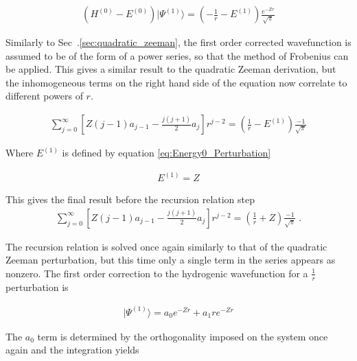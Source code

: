 
            \begin{align}
                \left(H^{(0)} - E^{(0)}\right) \vert \varPsi^{(1)}\rangle = \left( -\frac{1}{r} - E^{(1)} \right) \frac{e^{-Zr}}{\sqrt{\pi}}
            \end{align}

            \noindent Similarly to Sec~.\ref{sec:quadratic_zeeman}, the first order corrected wavefunction is assumed to be of the form of a power series, so that the method of Frobenius can be applied. This gives a similar result to the quadratic Zeeman derivation, but the inhomogeneous terms on the right hand side of the equation now correlate to different powers of $r$.

            \begin{align}
                \sum_{j = 0}^\infty \left[ Z(j-1)a_{j-1} - \frac{j(j+1)}{2} a_j \right] r^{j -2} = \left( \frac{1}{r} - E^{(1)} \right) \frac{-1}{\sqrt{\pi}}
            \end{align}

            \noindent Where $E^{(1)}$ is defined by equation \eqref{eq:Energy0_Perturbation}

            \begin{align}
                E^{(1)} = Z
            \end{align}

            \noindent This gives the final result before the recursion relation step
            \begin{align}
                \sum_{j = 0}^\infty \left[ Z(j-1)a_{j-1} - \frac{j(j+1)}{2} a_j \right] r^{j -2} = \left( \frac{1}{r} + Z \right) \frac{-1}{\sqrt{\pi}}\;.
            \end{align}

            \noindent The recursion relation is solved once again similarly to that of the quadratic Zeeman perturbation, but this time only a single term in the series appears as nonzero. The first order correction to the hydrogenic wavefunction for a $\frac{1}{r}$ perturbation is 

            \begin{align}
                \vert \varPsi^{(1)} \rangle = a_0 e^{-Zr} + a_1 re^{-Zr}
            \end{align}

            \noindent The $a_0$ term is determined by the orthogonality imposed on the system once again and the integration yields 
            
